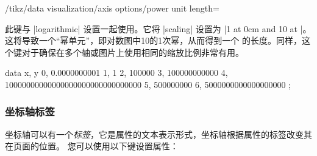 \begin{key}{/tikz/data visualization/axis options/power unit length=} %

    此键与 |logarithmic| 设置一起使用。它将 |scaling| 设置为 |1 at 0cm and 10 at |。这将导致一个``幂单元''，即对数图中10的1次幂，从而得到一个  的长度。同样，这个键对于确保在多个轴或图片上使用相同的缩放比例非常有用。
\begin{codeexample}[width=8cm,preamble={\usetikzlibrary{datavisualization}}]
\tikz \datavisualization
  [scientific axes,
   y axis={logarithmic, power unit length=1mm, grid},
   visualize as line]
 data {
   x, y
   0, 0.0000000001
   1, 1
   2, 100000
   3, 100000000000
   4, 10000000000000000000000000000000
   5, 500000000
   6, 5000000000000000000
 };
\end{codeexample}
\end{key}


\subsubsection{坐标轴标签}


坐标轴可以有一个\emph{标签}，它是属性的文本表示形式，坐标轴根据属性的标签改变其在页面的位置。 您可以使用以下键设置属性：

